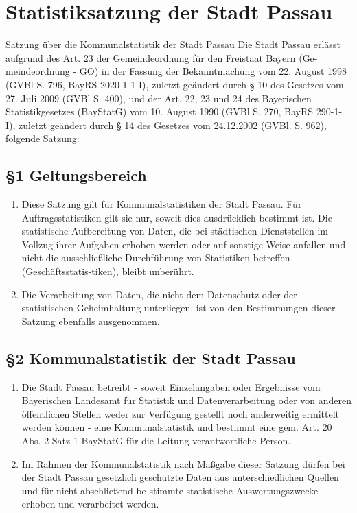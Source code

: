 \documentclass[A4, 12pt]{scrbook}
\begin{document}
\chapter{Statistiksatzung der Stadt Passau}{Satzung über die Kommunalstatistik der Stadt Passau}
  Die Stadt Passau erlässt aufgrund des Art. 23 der Gemeindeordnung für den Freistaat Bayern (Ge-meindeordnung - GO) in der Fassung der Bekanntmachung vom 22. August 1998 (GVBl S. 796, BayRS 2020-1-1-I), zuletzt geändert durch § 10 des Gesetzes vom 27. Juli 2009 (GVBl S. 400), und der Art. 22, 23 und 24 des Bayerischen Statistikgesetzes (BayStatG) vom 10. August 1990 (GVBl S. 270, BayRS 290-1-I), zuletzt geändert durch § 14 des Gesetzes vom 24.12.2002 (GVBl. S. 962), folgende Satzung:
  \section{\S1 Geltungsbereich}
    \begin{enumerate}[label=(\arabic*)]
      \item Diese Satzung gilt für Kommunalstatistiken der Stadt Passau. Für Auftragsstatistiken gilt sie nur, soweit dies ausdrücklich bestimmt ist. Die statistische Aufbereitung von Daten, die bei städtischen Dienststellen im Vollzug ihrer Aufgaben erhoben werden oder auf sonstige Weise anfallen und nicht die ausschließliche Durchführung von Statistiken betreffen (Geschäftsstatis-tiken), bleibt unberührt. 
      \item Die Verarbeitung von Daten, die nicht dem Datenschutz oder der statistischen Geheimhaltung unterliegen, ist von den Bestimmungen dieser Satzung ebenfalls ausgenommen. 
    \end{enumerate}

  \section{\S2 Kommunalstatistik der Stadt Passau}
    \begin{enumerate}[label=(\arabic*)]
      \item Die Stadt Passau betreibt - soweit Einzelangaben oder Ergebnisse vom Bayerischen Landesamt für Statistik und Datenverarbeitung oder von anderen öffentlichen Stellen weder zur Verfügung gestellt noch anderweitig ermittelt werden können - eine Kommunalstatistik und bestimmt eine gem. Art. 20 Abs. 2 Satz 1 BayStatG für die Leitung verantwortliche Person.
      \item Im Rahmen der Kommunalstatistik nach Maßgabe dieser Satzung dürfen bei der Stadt Passau gesetzlich geschützte Daten aus unterschiedlichen Quellen und für nicht abschließend be-stimmte statistische Auswertungszwecke erhoben und verarbeitet werden.
    \end{enumerate}
 
\end{document}
